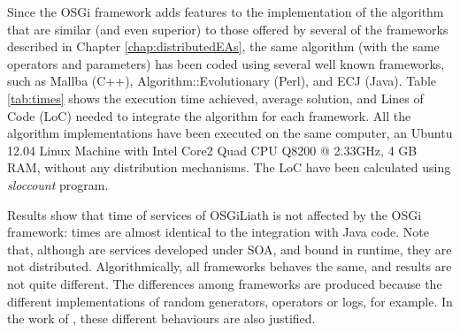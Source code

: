 Since the OSGi framework adds features to the implementation of the algorithm that are similar (and even superior) to those offered by several of the frameworks described in Chapter \ref{chap:distributedEAs}, the same algorithm (with the same operators and parameters) has been coded using several well known frameworks, such as Mallba (C++), Algorithm::Evolutionary (Perl), and ECJ (Java). Table \ref{tab:times} shows the execution time achieved, average solution, and Lines of Code (LoC) needed to integrate the algorithm for each framework. All the algorithm implementations have been executed on the same computer, an Ubuntu 12.04 Linux Machine with Intel Core2 Quad CPU Q8200 @ 2.33GHz, 4 GB RAM, without any distribution mechanisms. The LoC have been calculated using {\em sloccount} program.






\begin{table}
\caption{Comparison of tested EA frameworks in time and development.}
\label{tab:times}
\end{table}

Results show that time of services of OSGiLiath is not affected by the OSGi framework: times are almost identical to the integration with Java code. Note that, although are services developed under SOA, and bound in runtime, they are not distributed. Algorithmically, all frameworks behaves the same, and results are not quite different. The differences among frameworks are produced because the different implementations of random generators, operators or logs, for example. In the work of  \cite{PERL}, these different behaviours are also justified.



